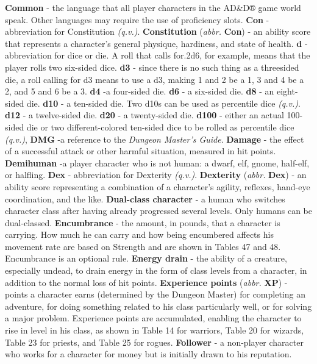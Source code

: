 \documentclass[../main.tex]{subfiles}
\begin{document}
\begin{multicols}{3}
\textbf{Common} - the language that all player characters in the AD&D® game world speak. Other languages may require the use of proficiency slots.
\textbf{Con} - abbreviation for Constitution \textit{(q.v.)}.
\textbf{Constitution} (\textit{abbr.} \textbf{Con}) - an ability score that represents a character's general physique, hardiness, and state of health.
\textbf{d} - abbreviation for dice or die. A roll that calls for.2d6, for example, means that the player rolls two six-sided dice.
\textbf{d3} - since there is no such thing as a threesided die, a roll calling for d3 means to use a d3, making 1 and 2 be a 1, 3 and 4 be a 2, and 5 and 6 be a 3.
\textbf{d4} -a four-sided die.
\textbf{d6} - a six-sided die.
\textbf{d8} - an eight-sided die.
\textbf{d10} - a ten-sided die. Two d10s can be used as percentile dice \textit{(q.v.)}.
\textbf{d12} - a twelve-sided die.
\textbf{d20} - a twenty-sided die.
\textbf{d100} - either an actual 100-sided die or two different-colored ten-sided dice to be rolled as percentile dice \textit{(q.v.)},
\textbf{DMG} -a reference to the \textit{Dungeon Master's Guide}.
\textbf{Damage} - the effect of a successful attack or other harmful situation, measured in hit points.
\textbf{Demihuman} -a player character who is not human: a dwarf, elf, gnome, half-elf, or halfling.
\textbf{Dex} - abbreviation for Dexterity \textit{(q.v.)}.
\textbf{Dexterity} (\textit{abbr.} \textbf{Dex}) - an ability score representing a combination of a character's agility, reflexes, hand-eye coordination, and the like.
\textbf{Dual-class character} - a human who switches character class after having already progressed several levels. Only humans can be dual-classed.
\textbf{Encumbrance} - the amount, in pounds, that a character is carrying. How much he can carry and how being encumbered affects his movement rate are based on Strength and are shown in Tables 47 and 48. Encumbrance is an optional rule.
\textbf{Energy drain} - the ability of a creature, especially undead, to drain energy in the form of class levels from a character, in addition to the normal loss of hit points.
\textbf{Experience points} (\textit{abbr.} \textbf{XP}) - points a character earns (determined by the Dungeon Master) for completing an adventure, for doing something related to his class particularly well, or for solving a major problem. Experience points are accumulated, enabling the character to rise in level in his class, as shown in Table 14 for warriors, Table 20 for wizards, Table 23 for priests, and Table 25 for rogues.
\textbf{Follower} - a non-player character who works for a character for money but is initially drawn to his reputation.

\end{multicols}
\end{document}
